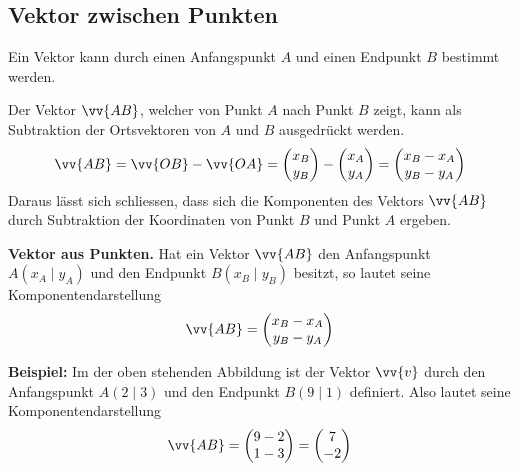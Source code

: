 \subsection{Vektor zwischen Punkten}

Ein Vektor kann durch einen Anfangspunkt $A$ und einen Endpunkt $B$ bestimmt werden.

\begin{center}
\end{center}
Der Vektor $\vv{AB}$, welcher von Punkt $A$ nach Punkt $B$ zeigt, kann als Subtraktion der Ortsvektoren von $A$ und $B$ ausgedrückt werden.
\[
  \vv{AB} = \vv{OB} - \vv{OA} = \vxy{x_{B}}{y_{B}} - \vxy{x_{A}}{y_{A}} = \vxy{x_{B}-x_{A}}{y_{B}-y_{A}}
\]
Daraus lässt sich schliessen, dass sich die Komponenten des Vektors $\vv{AB}$ durch Subtraktion der Koordinaten von Punkt $B$ und Punkt $A$ ergeben.


\begin{theorem}
  \textbf{Vektor aus Punkten.} Hat ein Vektor $\vv{AB}$ den Anfangspunkt $A(x_{A}\mid y_{A})$ und den Endpunkt $B(x_{B}\mid y_{B})$ besitzt, so lautet seine Komponentendarstellung
  \[
    \vv{AB} = \vxy{x_{B}-x_{A}}{y_{B}-y_{A}}
  \]
\end{theorem}

\begin{example}
  \textbf{Beispiel:} Im der oben stehenden Abbildung ist der Vektor $\vv{v}$ durch den Anfangspunkt $A(2\mid 3)$ und den Endpunkt $B(9\mid 1)$ definiert. Also lautet seine Komponentendarstellung
  \[
    \vv{AB} = \vxy{9-2}{1-3} = \vxy{7}{-2}
  \]
\end{example}
